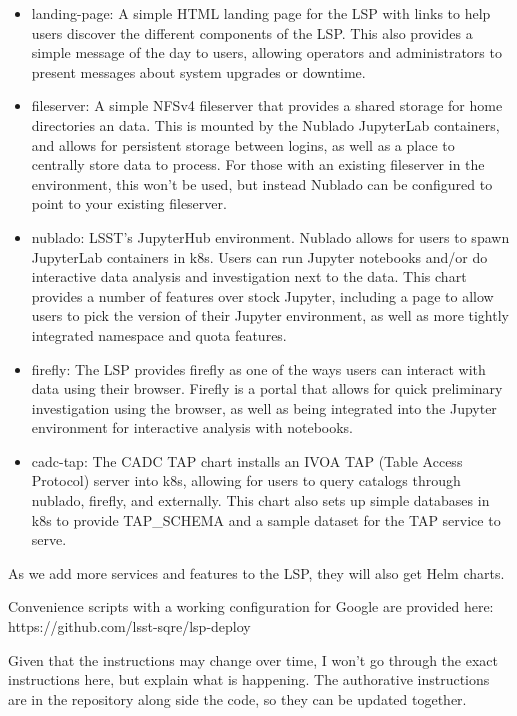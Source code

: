 \documentclass[11pt,twoside]{article}
\begin{document}
\begin{itemize}

\item landing-page: A simple HTML landing page for the LSP with links to help users
discover the different components of the LSP.  This also provides a simple message of
the day to users, allowing operators and administrators to present messages about
system upgrades or downtime.

\item fileserver: A simple NFSv4 fileserver that provides a shared storage for
home directories an data.  This is mounted by the Nublado JupyterLab containers,
and allows for persistent storage between logins, as well as a place to centrally
store data to process.  For those with an existing fileserver in the environment,
this won't be used, but instead Nublado can be configured to point to your existing
fileserver.

\item nublado: LSST's JupyterHub environment.  Nublado allows for users to spawn
JupyterLab containers in k8s.  Users can run Jupyter notebooks and/or do interactive
data analysis and investigation next to the data.  This chart provides a number of
features over stock Jupyter, including a page to allow users to pick the version of
their Jupyter environment, as well as more tightly integrated namespace and quota
features.

\item firefly: The LSP provides firefly as one of the ways users can interact with
data using their browser.  Firefly is a portal that allows for quick preliminary
investigation using the browser, as well as being integrated into the Jupyter
environment for interactive analysis with notebooks.

\item cadc-tap: The CADC TAP chart installs an IVOA TAP (Table Access Protocol)
server into k8s, allowing for users to query catalogs through nublado, firefly,
and externally.  This chart also sets up simple databases in k8s to provide
TAP\_SCHEMA and a sample dataset for the TAP service to serve.

\end{itemize}

As we add more services and features to the LSP, they will also get Helm charts.

Convenience scripts with a working configuration for Google are provided here:
https://github.com/lsst-sqre/lsp-deploy

Given that the instructions may change over time, I won't go through the exact
instructions here, but explain what is happening.  The authorative instructions
are in the repository along side the code, so they can be updated together.
\end{document}
